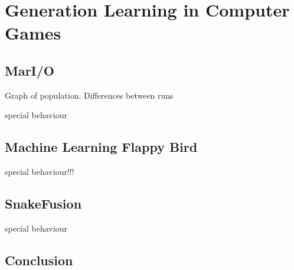 %
\chapter{Generation Learning in Computer Games}
\label{sec:analysis}

\section{MarI/O}
\label{sec:analysis:mario}

Graph of population. 
Differences between runs

special behaviour


\section{Machine Learning Flappy Bird}
\label{sec:analysis:flappy}

special behaviour!!!

\section{SnakeFusion}
\label{sec:analysis:flappy}

special behaviour


\section{Conclusion}
\label{sec:system:conclusion}
